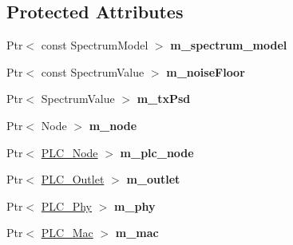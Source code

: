 \subsection*{\-Protected \-Attributes}
\begin{DoxyCompactItemize}
\item 
\hypertarget{classns3_1_1PLC__NetDevice_a04e11e268440c948f9f5600520924d49}{\-Ptr$<$ const \-Spectrum\-Model $>$ {\bfseries m\-\_\-spectrum\-\_\-model}}\label{classns3_1_1PLC__NetDevice_a04e11e268440c948f9f5600520924d49}

\item 
\hypertarget{classns3_1_1PLC__NetDevice_a07d943c3b7a4b48cf3c65e19b7c951bc}{\-Ptr$<$ const \-Spectrum\-Value $>$ {\bfseries m\-\_\-noise\-Floor}}\label{classns3_1_1PLC__NetDevice_a07d943c3b7a4b48cf3c65e19b7c951bc}

\item 
\hypertarget{classns3_1_1PLC__NetDevice_ab9db8d8da5aab33d27fa1643f8c74802}{\-Ptr$<$ \-Spectrum\-Value $>$ {\bfseries m\-\_\-tx\-Psd}}\label{classns3_1_1PLC__NetDevice_ab9db8d8da5aab33d27fa1643f8c74802}

\item 
\hypertarget{classns3_1_1PLC__NetDevice_a975b138e6f9c37981faa3b926381d68c}{\-Ptr$<$ \-Node $>$ {\bfseries m\-\_\-node}}\label{classns3_1_1PLC__NetDevice_a975b138e6f9c37981faa3b926381d68c}

\item 
\hypertarget{classns3_1_1PLC__NetDevice_a05ef2b678175e2bd9c67f30a6a9d172a}{\-Ptr$<$ \hyperlink{classns3_1_1PLC__Node}{\-P\-L\-C\-\_\-\-Node} $>$ {\bfseries m\-\_\-plc\-\_\-node}}\label{classns3_1_1PLC__NetDevice_a05ef2b678175e2bd9c67f30a6a9d172a}

\item 
\hypertarget{classns3_1_1PLC__NetDevice_a097f9938b996cff92d6bb5f22556b0cc}{\-Ptr$<$ \hyperlink{classns3_1_1PLC__Outlet}{\-P\-L\-C\-\_\-\-Outlet} $>$ {\bfseries m\-\_\-outlet}}\label{classns3_1_1PLC__NetDevice_a097f9938b996cff92d6bb5f22556b0cc}

\item 
\hypertarget{classns3_1_1PLC__NetDevice_a69c08661d70f06a3540bc0a25cfc880d}{\-Ptr$<$ \hyperlink{classns3_1_1PLC__Phy}{\-P\-L\-C\-\_\-\-Phy} $>$ {\bfseries m\-\_\-phy}}\label{classns3_1_1PLC__NetDevice_a69c08661d70f06a3540bc0a25cfc880d}

\item 
\hypertarget{classns3_1_1PLC__NetDevice_a6150d09befada7f99c1e16fa2de0e8cd}{\-Ptr$<$ \hyperlink{classns3_1_1PLC__Mac}{\-P\-L\-C\-\_\-\-Mac} $>$ {\bfseries m\-\_\-mac}}\label{classns3_1_1PLC__NetDevice_a6150d09befada7f99c1e16fa2de0e8cd}


\end{DoxyCompactItemize}
